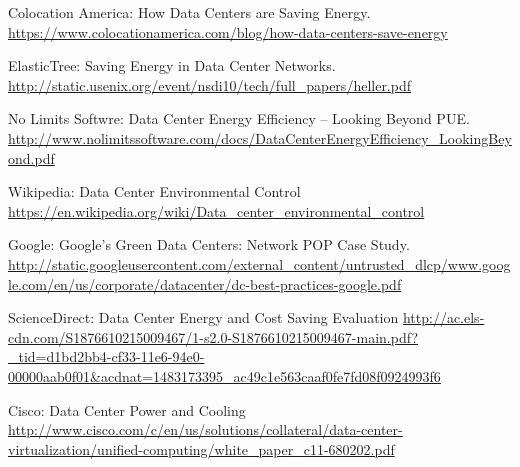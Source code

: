 \documentclass[10pt]{article}
\begin{document}
\begin{thebibliography}{9}
		Colocation America: How Data Centers are Saving Energy. \newline
		\url{https://www.colocationamerica.com/blog/how-data-centers-save-energy}

		ElasticTree: Saving Energy in Data Center Networks. \newline
		\url{http://static.usenix.org/event/nsdi10/tech/full_papers/heller.pdf}

		No Limits Softwre: Data Center Energy Efficiency – Looking Beyond PUE. \newline
		\url{http://www.nolimitssoftware.com/docs/DataCenterEnergyEfficiency_LookingBeyond.pdf}

		Wikipedia: Data Center Environmental Control \newline
		\url{https://en.wikipedia.org/wiki/Data_center_environmental_control}

		Google: Google’s Green Data Centers: Network POP Case Study.\newline
		\url{http://static.googleusercontent.com/external_content/untrusted_dlcp/www.google.com/en/us/corporate/datacenter/dc-best-practices-google.pdf}

		ScienceDirect: Data Center Energy and Cost Saving Evaluation \newline
		\url{http://ac.els-cdn.com/S1876610215009467/1-s2.0-S1876610215009467-main.pdf?_tid=d1bd2bb4-cf33-11e6-94e0-00000aab0f01&acdnat=1483173395_ac49c1e563caaf0fe7fd08f0924993f6}

		Cisco: Data Center Power and Cooling \newline
		\url{http://www.cisco.com/c/en/us/solutions/collateral/data-center-virtualization/unified-computing/white_paper_c11-680202.pdf}

	\end{thebibliography}
\end{document}
